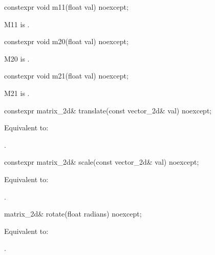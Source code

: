 %
\begin{itemdecl}
constexpr void m11(float val) noexcept;
\end{itemdecl}
\begin{itemdescr}
\pnum
\effects
M11 is .
\end{itemdescr}

%
\begin{itemdecl}
constexpr void m20(float val) noexcept;
\end{itemdecl}
\begin{itemdescr}
\pnum
\effects
M20 is .
\end{itemdescr}

%
\begin{itemdecl}
constexpr void m21(float val) noexcept;
\end{itemdecl}
\begin{itemdescr}
\pnum
\effects
M21 is .
\end{itemdescr}

%
\begin{itemdecl}
constexpr matrix_2d& translate(const vector_2d& val) noexcept;
\end{itemdecl}
\begin{itemdescr}
\pnum
\effects
Equivalent to: 

\pnum
\returns
{}.
\end{itemdescr}

%
\begin{itemdecl}
constexpr matrix_2d& scale(const vector_2d& val) noexcept;
\end{itemdecl}
\begin{itemdescr}
\pnum
\effects
Equivalent to: 

\pnum
\returns
{}.
\end{itemdescr}

%
\begin{itemdecl}
matrix_2d& rotate(float radians) noexcept;
\end{itemdecl}
\begin{itemdescr}
\pnum
\effects
Equivalent to: 

\pnum
\returns
{}.
\end{itemdescr}

